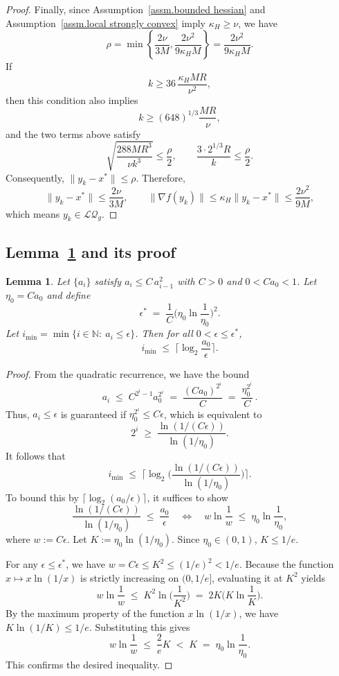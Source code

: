 \documentclass{article}
\newtheorem{lemma}[theorem]{Lemma}
\numberwithin{equation}{section}
\numberwithin{equation}{section}
\begin{document}
\begin{proof}
    Finally, since Assumption~\ref{assm.bounded hessian} and
    Assumption~\ref{assm.local strongly convex} imply $\kappa_H\geq \nu$, we have
    \[
        \rho
        =\min\left\{\frac{2\nu}{3M},\frac{2\nu^2}{9\kappa_HM}\right\}
        =\frac{2\nu^2}{9\kappa_HM}.
    \]
    If
    \[
        k\geq 36\,\frac{\kappa_H M R}{\nu^2},
    \]
    then this condition also implies
    \[
        k\geq (648)^{1/3}\frac{MR}{\nu},
    \]
    and the two terms above satisfy
    \[
        \sqrt{\frac{288MR^3}{\nu k^3}}
        \leq \frac{\rho}{2},
        \qquad
        \frac{3\cdot 2^{1/3}R}{k}
        \leq \frac{\rho}{2}.
    \]
    Consequently,
    \(
    \|y_k-x^*\|\leq \rho.
    \)
    Therefore,
    \[
        \|y_k-x^*\|\leq \frac{2\nu}{3M},
        \qquad
        \|\nabla f(y_k)\|
        \leq \kappa_H\|y_k-x^*\|
        \leq \frac{2\nu^2}{9M},
    \]
    which means $y_k\in\mathcal{LQ}_g$.
\end{proof}

\subsection*{Lemma~\ref{lem.loglog vs log} and its proof}
\begin{lemma}\label{lem.loglog vs log}
    Let $\{a_i\}$ satisfy $a_i \le C\,a_{i-1}^2$ with $C>0$ and $0<Ca_0<1$. Let $\eta_0 = Ca_0$ and define
    \[
        \epsilon^* \;=\; \frac{1}{C} \Big(\eta_0\ln\!\frac{1}{\eta_0}\Big)^2.
    \]
    Let $i_{\min} = \min\{i\in\mathbb{N}:\ a_i\le \epsilon\}$. Then for all $0 < \epsilon \leq \epsilon^*$,
    \[
        i_{\min}\;\le\;\Big\lceil \log_2\!\frac{a_0}{\epsilon}\Big\rceil.
    \]
\end{lemma}

\begin{proof}
    From the quadratic recurrence, we have the bound
    \[
        a_i \;\le\; C^{2^{i}-1} a_0^{2^{i}} \;=\; \frac{(C a_0)^{2^{i}}}{C} \;=\; \frac{\eta_0^{2^{i}}}{C}\,.
    \]
    Thus, $a_i\le\epsilon$ is guaranteed if $\eta_0^{2^{i}}\le C\epsilon$, which is equivalent to
    \[
        2^{i} \;\ge\; \frac{\ln(1/(C\epsilon))}{\ln(1/\eta_0)}.
    \]
    It follows that
    \[
        i_{\min}\;\le\;\Big\lceil \log_2\!\Big(\frac{\ln(1/(C\epsilon))}{\ln(1/\eta_0)}\Big)\Big\rceil.
    \]
    To bound this by $\lceil \log_2(a_0/\epsilon) \rceil$, it suffices to show
    \[
        \frac{\ln(1/(C\epsilon))}{\ln(1/\eta_0)} \;\le\; \frac{a_0}{\epsilon} \quad\Longleftrightarrow\quad w\ln\!\frac{1}{w}\;\le\;\eta_0\ln\!\frac{1}{\eta_0},
    \]
    where $w := C\epsilon$. Let $K := \eta_0\ln(1/\eta_0)$. Since $\eta_0 \in (0, 1)$, $K \le 1/e$.

    For any $\epsilon \le \epsilon^*$, we have $w = C\epsilon \le K^2 \le (1/e)^2 < 1/e$. Because the function $x \mapsto x\ln(1/x)$ is strictly increasing on $(0, 1/e]$, evaluating it at $K^2$ yields
    \[
        w\ln\!\frac{1}{w} \;\le\; K^2 \ln\!\Big(\frac{1}{K^2}\Big) \;=\; 2K \Big(K\ln\!\frac{1}{K}\Big).
    \]
    By the maximum property of the function $x\ln(1/x)$, we have $K\ln(1/K) \le 1/e$. Substituting this gives
    \[
        w\ln\!\frac{1}{w} \;\le\; \frac{2}{e}K \;<\; K \;=\; \eta_0\ln\!\frac{1}{\eta_0}.
    \]
    This confirms the desired inequality.
\end{proof}
\end{document}
